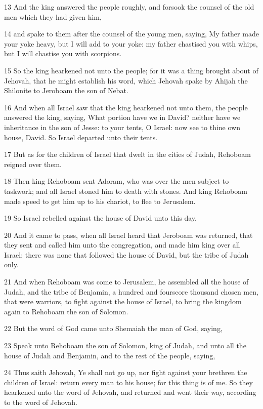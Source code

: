 \par 13 And the king answered the people roughly, and forsook the counsel of the old men which they had given him,
\par 14 and spake to them after the counsel of the young men, saying, My father made your yoke heavy, but I will add to your yoke: my father chastised you with whips, but I will chastise you with scorpions.
\par 15 So the king hearkened not unto the people; for it was a thing brought about of Jehovah, that he might establish his word, which Jehovah spake by Ahijah the Shilonite to Jeroboam the son of Nebat.
\par 16 And when all Israel saw that the king hearkened not unto them, the people answered the king, saying, What portion have we in David? neither have we inheritance in the son of Jesse: to your tents, O Israel: now see to thine own house, David. So Israel departed unto their tents.
\par 17 But as for the children of Israel that dwelt in the cities of Judah, Rehoboam reigned over them.
\par 18 Then king Rehoboam sent Adoram, who was over the men subject to taskwork; and all Israel stoned him to death with stones. And king Rehoboam made speed to get him up to his chariot, to flee to Jerusalem.
\par 19 So Israel rebelled against the house of David unto this day.
\par 20 And it came to pass, when all Israel heard that Jeroboam was returned, that they sent and called him unto the congregation, and made him king over all Israel: there was none that followed the house of David, but the tribe of Judah only.
\par 21 And when Rehoboam was come to Jerusalem, he assembled all the house of Judah, and the tribe of Benjamin, a hundred and fourscore thousand chosen men, that were warriors, to fight against the house of Israel, to bring the kingdom again to Rehoboam the son of Solomon.
\par 22 But the word of God came unto Shemaiah the man of God, saying,
\par 23 Speak unto Rehoboam the son of Solomon, king of Judah, and unto all the house of Judah and Benjamin, and to the rest of the people, saying,
\par 24 Thus saith Jehovah, Ye shall not go up, nor fight against your brethren the children of Israel: return every man to his house; for this thing is of me. So they hearkened unto the word of Jehovah, and returned and went their way, according to the word of Jehovah.
